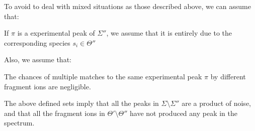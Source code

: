 
To avoid to deal with mixed situations as those described above, we can assume that:
\begin{hypothesis}
If $\pi$ is a experimental peak of $\Sigma''$, we assume that it is entirely due
to the corresponding species $s_i\in\Theta''$
\end{hypothesis}
Also, we assume that:
\begin{hypothesis}
The chances of multiple matches to the same experimental peak $\pi$ by different
fragment ions are negligible.
\end{hypothesis}
The above defined sets imply that all the peaks in $\Sigma \setminus \Sigma''$
are a product of noise, and that all the fragment ions in 
$\Theta'\setminus \Theta''$ have not produced any peak in the spectrum.
% 
% 

